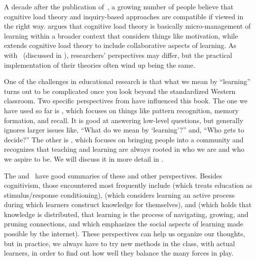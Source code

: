 A decade after the publication of~\cite{Kirs2006},
a growing number of people believe that cognitive load theory and inquiry-based approaches are compatible
if viewed in the right way.
\cite{Kaly2015} argues that cognitive load theory is basically micro-management of learning
within a broader context that considers things like motivation,
while~\cite{Kirs2018} extends cognitive load theory to include collaborative aspects of learning.
As with~\cite{Mark2018} (discussed in ),
researchers' perspectives may differ,
but the practical implementation of their theories often wind up being the same.

One of the challenges in educational research is that
what we mean by ``learning'' turns out to be complicated
once you look beyond the standardized Western classroom.
Two specific perspectives from  have influenced this book.
The one we have used so far is ,
which focuses on things like pattern recognition, memory formation, and recall.
It is good at answering low-level questions,
but generally ignores larger issues like,
``What do we mean by `learning'?''
and, ``Who gets to decide?''
The other is ,
which focuses on bringing people into a community
and recognizes that
teaching and learning are always rooted in who we are and who we aspire to be.
We will discuss it in more detail in .

The 
and~\cite{Wibu2016}
have good summaries of these and other perspectives.
Besides cognitivism,
those encountered most frequently include 
(which treats education as stimulus/response conditioning),
(which considers learning an active process during which learners construct knowledge for themselves),
and 
(which holds that knowledge is distributed,
that learning is the process of navigating, growing, and pruning connections,
and which emphasizes the social aspects of learning made possible by the internet).
These perspectives can help us organize our thoughts,
but in practice,
we always have to try new methods in the class,
with actual learners,
in order to find out how well they balance the many forces in play.



